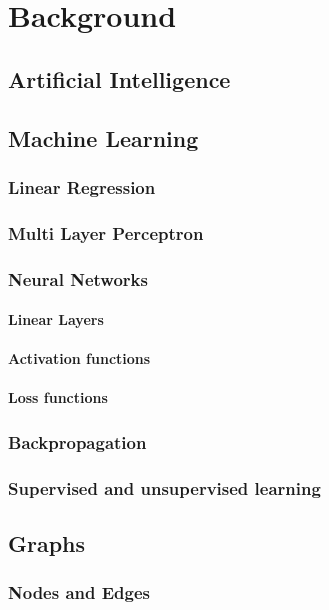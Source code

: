 \chapter{Background}


\section{Artificial Intelligence}

\section{Machine Learning}
\subsection{Linear Regression}
\subsection{Multi Layer Perceptron}
\subsection{Neural Networks}
\subsubsection{Linear Layers}
\subsubsection{Activation functions}
\subsubsection{Loss functions}
\subsection{Backpropagation}
\subsection{Supervised and unsupervised learning}


\section{Graphs}
\subsection{Nodes and Edges}
